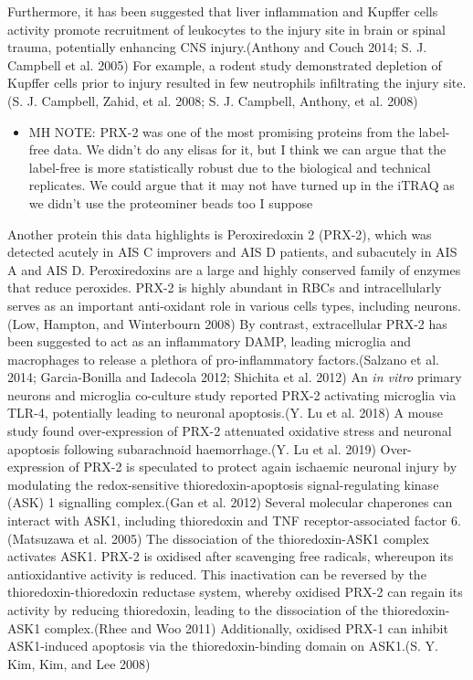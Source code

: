 \documentclass[9pt,lineno]{elife}
\providecommand{\tightlist}{%
  \setlength{\itemsep}{0pt}\setlength{\parskip}{0pt}}
\begin{document}
\begin{landscape}
\begin{landscape}
Furthermore, it has been suggested that liver inflammation and Kupffer cells activity promote recruitment of leukocytes to the injury site in brain or spinal trauma, potentially enhancing CNS injury.(Anthony and Couch 2014; S. J. Campbell et al. 2005) For example, a rodent study demonstrated depletion of Kupffer cells prior to injury resulted in few neutrophils infiltrating the injury site.(S. J. Campbell, Zahid, et al. 2008; S. J. Campbell, Anthony, et al. 2008)

\begin{itemize}
\tightlist
\item
  MH NOTE: PRX-2 was one of the most promising proteins from the label-free data. We didn't do any elisas for it, but I think we can argue that the label-free is more statistically robust due to the biological and technical replicates. We could argue that it may not have turned up in the iTRAQ as we didn't use the proteominer beads too I suppose
\end{itemize}

Another protein this data highlights is Peroxiredoxin 2 (PRX-2), which was detected acutely in AIS C improvers and AIS D patients, and subacutely in AIS A and AIS D. Peroxiredoxins are a large and highly conserved family of enzymes that reduce peroxides.
PRX-2 is highly abundant in RBCs and intracellularly serves as an important anti-oxidant role in various cells types, including neurons.(Low, Hampton, and Winterbourn 2008) By contrast, extracellular PRX-2 has been suggested to act as an inflammatory DAMP, leading microglia and macrophages to release a plethora of pro-inflammatory factors.(Salzano et al. 2014; Garcia-Bonilla and Iadecola 2012; Shichita et al. 2012) An \emph{in vitro} primary neurons and microglia co-culture study reported PRX-2 activating microglia via TLR-4, potentially leading to neuronal apoptosis.(Y. Lu et al. 2018) A mouse study found over-expression of PRX-2 attenuated oxidative stress and neuronal apoptosis following subarachnoid haemorrhage.(Y. Lu et al. 2019) Over-expression of PRX-2 is speculated to protect again ischaemic neuronal injury by modulating the redox-sensitive thioredoxin-apoptosis signal-regulating kinase (ASK) 1 signalling complex.(Gan et al. 2012) Several molecular chaperones can interact with ASK1, including thioredoxin and TNF receptor-associated factor 6.(Matsuzawa et al. 2005) The dissociation of the thioredoxin-ASK1 complex activates ASK1.
PRX-2 is oxidised after scavenging free radicals, whereupon its antioxidantive activity is reduced.
This inactivation can be reversed by the thioredoxin-thioredoxin reductase system, whereby oxidised PRX-2 can regain its activity by reducing thioredoxin, leading to the dissociation of the thioredoxin-ASK1 complex.(Rhee and Woo 2011) Additionally, oxidised PRX-1 can inhibit ASK1-induced apoptosis via the thioredoxin-binding domain on ASK1.(S. Y. Kim, Kim, and Lee 2008)


\end{landscape}
\end{landscape}
\end{document}
